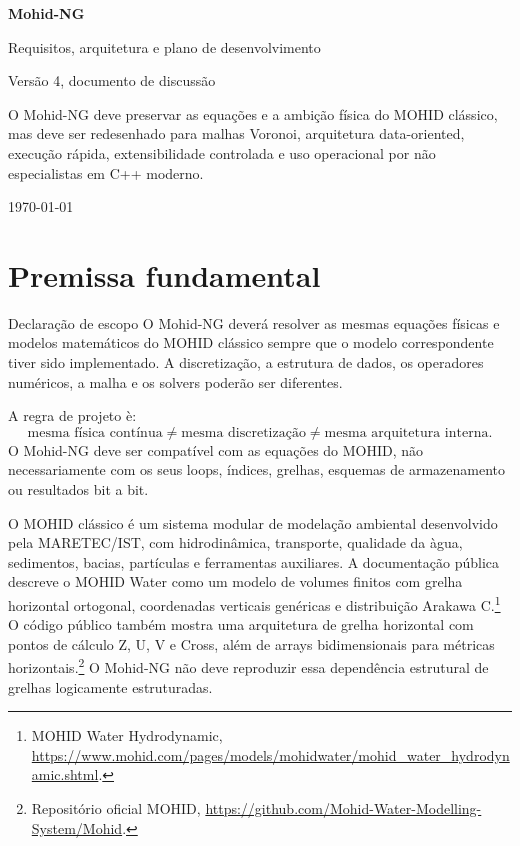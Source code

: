 \documentclass[11pt,a4paper]{article}
\begin{document}
\begin{titlepage}
\centering
\vspace*{14mm}
{\Huge\bfseries\color{MohidBlue} Mohid-NG\par}
\vspace{3mm}
{\Large\color{MohidInk} Requisitos, arquitetura e plano de desenvolvimento\par}
\vspace{5mm}
{\large\color{MohidGray} Vers\~ao 4, documento de discuss\~ao\par}
\vfill
\begin{tcolorbox}[colback=MohidBlue!5,width=0.86\textwidth]
\large
O Mohid-NG deve preservar as equa\c{c}\~oes e a ambi\c{c}\~ao f\'isica do MOHID cl\'assico, mas deve ser redesenhado para malhas Voronoi, arquitetura data-oriented, execu\c{c}\~ao r\'apida, extensibilidade controlada e uso operacional por n\~ao especialistas em C++ moderno.
\end{tcolorbox}
\vfill
{\color{MohidGray}\today\par}
\end{titlepage}

\tableofcontents
\newpage

\section{Premissa fundamental}

\begin{principlebox}{Declara\c{c}\~ao de escopo}
O Mohid-NG dever\'a resolver as mesmas equa\c{c}\~oes f\'isicas e modelos matem\'aticos do MOHID cl\'assico sempre que o modelo correspondente tiver sido implementado. A discretiza\c{c}\~ao, a estrutura de dados, os operadores num\'ericos, a malha e os solvers poder\~ao ser diferentes.
\end{principlebox}

A regra de projeto \`e:
\[
\text{mesma f\'isica cont\'inua}\neq\text{mesma discretiza\c{c}\~ao}\neq\text{mesma arquitetura interna}.
\]
O Mohid-NG deve ser compat\'ivel com as equa\c{c}\~oes do MOHID, n\~ao necessariamente com os seus loops, \'{i}ndices, grelhas, esquemas de armazenamento ou resultados bit a bit.

O MOHID cl\'assico \'e um sistema modular de modela\c{c}\~ao ambiental desenvolvido pela MARETEC/IST, com hidrodin\^amica, transporte, qualidade da \`agua, sedimentos, bacias, part\'iculas e ferramentas auxiliares. A documenta\c{c}\~ao p\'ublica descreve o MOHID Water como um modelo de volumes finitos com grelha horizontal ortogonal, coordenadas verticais gen\'ericas e distribui\c{c}\~ao Arakawa C.\footnote{MOHID Water Hydrodynamic, \url{https://www.mohid.com/pages/models/mohidwater/mohid_water_hydrodynamic.shtml}.} O c\'odigo p\'ublico tamb\'em mostra uma arquitetura de grelha horizontal com pontos de c\'alculo Z, U, V e Cross, al\'em de arrays bidimensionais para m\'etricas horizontais.\footnote{Reposit\'orio oficial MOHID, \url{https://github.com/Mohid-Water-Modelling-System/Mohid}.} O Mohid-NG n\~ao deve reproduzir essa depend\^encia estrutural de grelhas logicamente estruturadas.
\end{document}

